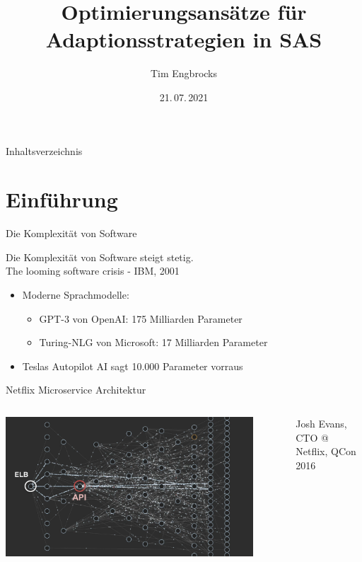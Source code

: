 \documentclass[de,16:9]{sdqbeamer}
\title[Optimierungsansätze für Adaptionsstrategien in SAS]{Optimierungsansätze für Adaptionsstrategien in SAS}
\author[Tim Engbrocks]{Tim Engbrocks}
\date[21.\,07.\,2021]{21.\,07.\,2021}
\begin{document}
\KITtitleframe

\begin{frame}{Inhaltsverzeichnis}
\tableofcontents
\end{frame}

\section{Einführung}

\begin{frame}{Die Komplexität von Software}
	\begin{center}
		Die Komplexität von Software steigt stetig. \\
		\glqq The looming software crisis \grqq - IBM, 2001
	\end{center}
	\medskip
	\begin{itemize}
		\item Moderne Sprachmodelle: 
		\begin{itemize}
			\item GPT-3 von OpenAI: 175 Milliarden Parameter \cite{GPT3}
			\item Turing-NLG von Microsoft: 17 Milliarden Parameter \cite{TuringNLG}
		\end{itemize}
		\item Teslas Autopilot AI sagt 10.000 Parameter vorraus \cite{TeslaAutopilot}
	\end{itemize}
\end{frame}

\begin{frame}{Netflix Microservice Architektur}
	\begin{columns}
		 \begin{center}
			\includegraphics[width=0.9\textwidth]{sources/Mastering Chaos.pdf}
		\end{center}
		 Josh Evans, CTO @ Netflix, QCon 2016 \cite{JoshQCon}
	\end{columns}
\end{frame}
\end{document}
